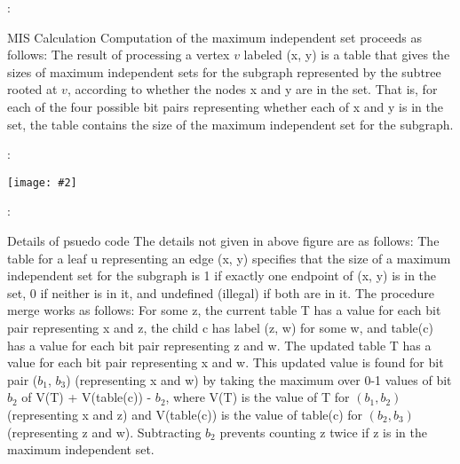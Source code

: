 \documentclass{beamer}
\newcommand{\iph}[2]{
    \texttt{[image: \#2]}
}
\begin{document}
\begin{frame}{\secname : \subsecname}
    \begin{block}{MIS Calculation}
        Computation of the maximum independent set proceeds as follows: The
        result of processing a vertex $v$ labeled (x, y) is a table that gives the sizes of
        maximum independent sets for the subgraph represented by the subtree rooted at $v$, according to whether the nodes x and y are in the set. That is, for each of
        the four possible bit pairs representing whether each of x and y is in the set,
        the table contains the size of the maximum independent set for the subgraph. 
    \end{block}
\end{frame}

\begin{frame}{\secname : \subsecname}
    \iph{0.9}{lin5}

\end{frame}



\begin{framefont}{\small}
\begin{frame}{\secname : \subsecname}
    \begin{block}{Details of psuedo code}
        The details not given in above figure are as follows: The table for a leaf u
representing an edge (x, y) specifies that the size of a maximum independent
set for the subgraph is 1 if exactly one endpoint of (x, y) is in the set, 0 if
neither is in it, and undefined (illegal) if both are in it. The procedure merge
works as follows: For some z, the current table T has a value for each bit pair
representing x and z, the child c has label (z, w) for some w, and table(c) has
a value for each bit pair representing z and w. The updated table T has a
value for each bit pair representing x and w. This updated value is found for
bit pair ($b_1$, $b_3$) (representing x and w) by taking the maximum over 0-1 values
of bit $b_2$ of V(T) + V(table(c)) - $b_2$, where V(T) is the value of T for $(b_1, b_2)$
(representing x and z) and V(table(c)) is the value of table(c) for $(b_2, b_3)$
(representing z and w). Subtracting $b_2$ prevents counting z twice if z is in the
maximum independent set. 
    \end{block}
\end{frame}
\end{framefont}
\end{document}
